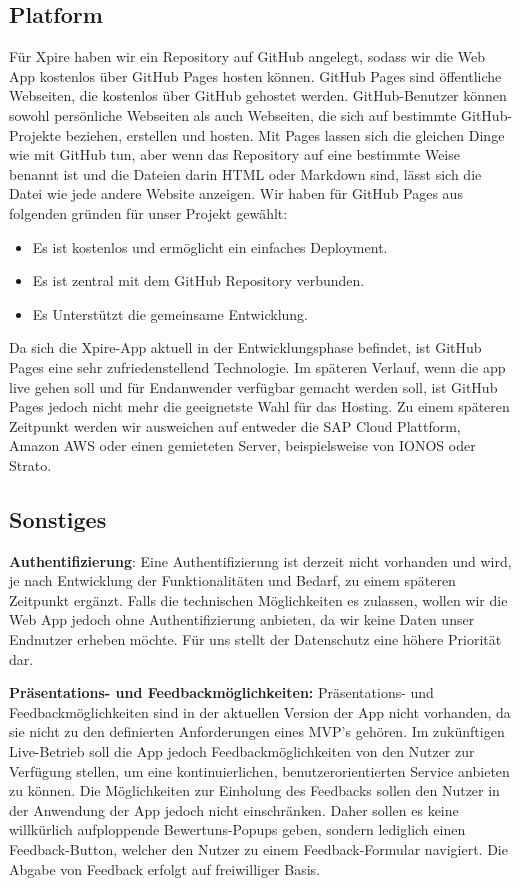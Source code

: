 \subsection{Platform}
Für Xpire haben wir ein Repository auf GitHub angelegt, sodass wir die Web App kostenlos über GitHub Pages hosten können. GitHub Pages sind öffentliche Webseiten, die kostenlos über GitHub gehostet werden. GitHub-Benutzer können sowohl persönliche Webseiten als auch Webseiten, die sich auf bestimmte GitHub-Projekte beziehen, erstellen und hosten. Mit Pages lassen sich die gleichen Dinge wie mit GitHub tun, aber wenn das Repository auf eine bestimmte Weise benannt ist und die Dateien darin HTML oder Markdown sind, lässt sich die Datei wie jede andere Website anzeigen.\autocite[vgl.][]{?} Wir haben für GitHub Pages aus folgenden gründen für unser Projekt gewählt:
\begin{itemize}[noitemsep]
	\item Es ist kostenlos und ermöglicht ein einfaches Deployment.
	\item Es ist zentral mit dem GitHub Repository verbunden.
	\item Es Unterstützt die gemeinsame Entwicklung.
\end{itemize}
Da sich die Xpire-App aktuell in der Entwicklungsphase befindet, ist GitHub Pages eine sehr zufriedenstellend Technologie. Im späteren Verlauf, wenn die app live gehen soll und für Endanwender verfügbar gemacht werden soll, ist GitHub Pages jedoch nicht mehr die geeignetste Wahl für das Hosting. Zu einem späteren Zeitpunkt werden wir ausweichen auf entweder die SAP Cloud Plattform, Amazon AWS oder einen gemieteten Server, beispielsweise von IONOS oder Strato.

\subsection{Sonstiges}
\textbf{Authentifizierung}: Eine Authentifizierung ist derzeit nicht vorhanden und wird, je nach Entwicklung der Funktionalitäten und Bedarf, zu einem späteren Zeitpunkt ergänzt. Falls die technischen Möglichkeiten es zulassen, wollen wir die Web App jedoch ohne Authentifizierung anbieten, da wir keine Daten unser Endnutzer erheben möchte. Für uns stellt der Datenschutz eine höhere Priorität dar.

\textbf{Präsentations- und Feedbackmöglichkeiten:} Präsentations- und Feedbackmöglichkeiten sind in der aktuellen Version der App nicht vorhanden, da sie nicht zu den definierten Anforderungen eines MVP's gehören. Im zukünftigen Live-Betrieb soll die App jedoch Feedbackmöglichkeiten von den Nutzer zur Verfügung stellen, um eine kontinuierlichen, benutzerorientierten Service anbieten zu können. Die Möglichkeiten zur Einholung des Feedbacks sollen den Nutzer in der Anwendung der App jedoch nicht einschränken. Daher sollen es keine willkürlich aufploppende Bewertuns-Popups geben, sondern lediglich einen Feedback-Button, welcher den Nutzer zu einem Feedback-Formular navigiert. Die Abgabe von Feedback erfolgt auf freiwilliger Basis.
	


